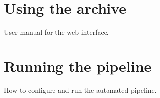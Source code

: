 \section{Using the archive} 

User manual for the web interface.

\section{Running the pipeline}

How to configure and run the automated pipeline.

